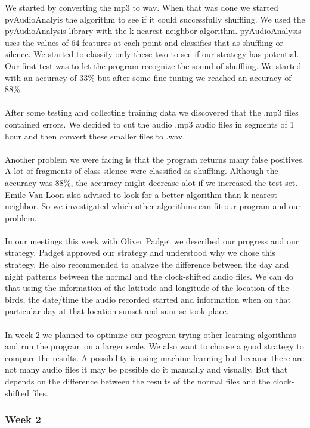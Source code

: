 \documentclass[a4paper]{article}
\begin{document}
We started by converting the mp3 to wav. When that was done we started pyAudioAnalyis the algorithm to see if it could successfully shuffling. We used the pyAudioAnalysis library with the k-nearest neighbor algorithm. pyAudioAnalysis uses the values of 64 features at each point and classifies that as shuffling or silence. We started to classify only these two to see if our strategy has potential.  Our first test was to let the program recognize the sound of shuffling. We started with an accuracy of 33\% but after some fine tuning we reached an accuracy of 88\%.\\\\
After some testing and collecting training data we discovered that the .mp3 files contained errors. We decided to cut the audio .mp3 audio files in segments of 1 hour and then convert these smaller files to .wav.\\\\
Another problem we were facing is that the program returns many false positives. A lot of fragments of class silence were classified as shuffling. Although the accuracy was 88\%, the accuracy might decrease alot if we increased the test set. Emile Van Loon also advised to look for a better algorithm than k-nearest neighbor. So we investigated which other algorithms can fit our program and our problem.\\\\
In our meetings this week with Oliver Padget we described our progress and our strategy. Padget approved our strategy and understood why we chose this strategy. He also recommended to analyze the difference between the day and night patterns between the normal and the clock-shifted audio files. We can do that using the information of the latitude and longitude of the location of the birds, the date/time the audio recorded started and information when on that particular day at that location sunset and sunrise took place.\\\\
In week 2 we planned to optimize our program trying other learning algorithms and run the program on a larger scale. We also want to choose a good strategy to compare the results. A possibility is using machine learning but because there are not many audio files it may be possible do it manually and visually. But that depends on the difference between the results of the normal files and the clock-shifted files. 

\subsubsection*{Week 2}
\end{document}
